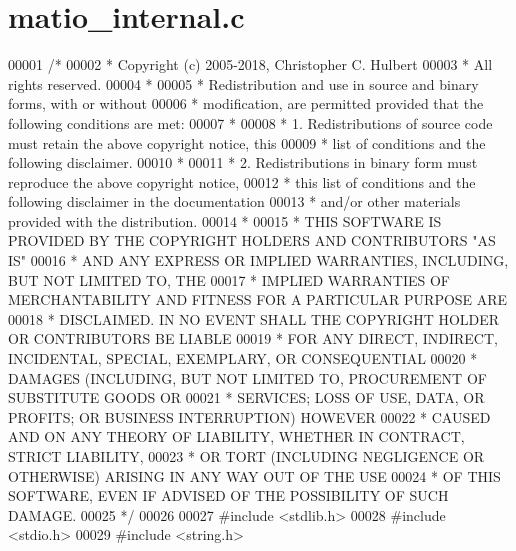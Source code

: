 \hypertarget{matio__internal_8c_source}{}\section{matio\+\_\+internal.\+c}
\label{matio__internal_8c_source}

\begin{DoxyCode}
00001 \textcolor{comment}{/*}
00002 \textcolor{comment}{ * Copyright (c) 2005-2018, Christopher C. Hulbert}
00003 \textcolor{comment}{ * All rights reserved.}
00004 \textcolor{comment}{ *}
00005 \textcolor{comment}{ * Redistribution and use in source and binary forms, with or without}
00006 \textcolor{comment}{ * modification, are permitted provided that the following conditions are met:}
00007 \textcolor{comment}{ *}
00008 \textcolor{comment}{ * 1. Redistributions of source code must retain the above copyright notice, this}
00009 \textcolor{comment}{ *    list of conditions and the following disclaimer.}
00010 \textcolor{comment}{ *}
00011 \textcolor{comment}{ * 2. Redistributions in binary form must reproduce the above copyright notice,}
00012 \textcolor{comment}{ *    this list of conditions and the following disclaimer in the documentation}
00013 \textcolor{comment}{ *    and/or other materials provided with the distribution.}
00014 \textcolor{comment}{ *}
00015 \textcolor{comment}{ * THIS SOFTWARE IS PROVIDED BY THE COPYRIGHT HOLDERS AND CONTRIBUTORS "AS IS"}
00016 \textcolor{comment}{ * AND ANY EXPRESS OR IMPLIED WARRANTIES, INCLUDING, BUT NOT LIMITED TO, THE}
00017 \textcolor{comment}{ * IMPLIED WARRANTIES OF MERCHANTABILITY AND FITNESS FOR A PARTICULAR PURPOSE ARE}
00018 \textcolor{comment}{ * DISCLAIMED. IN NO EVENT SHALL THE COPYRIGHT HOLDER OR CONTRIBUTORS BE LIABLE}
00019 \textcolor{comment}{ * FOR ANY DIRECT, INDIRECT, INCIDENTAL, SPECIAL, EXEMPLARY, OR CONSEQUENTIAL}
00020 \textcolor{comment}{ * DAMAGES (INCLUDING, BUT NOT LIMITED TO, PROCUREMENT OF SUBSTITUTE GOODS OR}
00021 \textcolor{comment}{ * SERVICES; LOSS OF USE, DATA, OR PROFITS; OR BUSINESS INTERRUPTION) HOWEVER}
00022 \textcolor{comment}{ * CAUSED AND ON ANY THEORY OF LIABILITY, WHETHER IN CONTRACT, STRICT LIABILITY,}
00023 \textcolor{comment}{ * OR TORT (INCLUDING NEGLIGENCE OR OTHERWISE) ARISING IN ANY WAY OUT OF THE USE}
00024 \textcolor{comment}{ * OF THIS SOFTWARE, EVEN IF ADVISED OF THE POSSIBILITY OF SUCH DAMAGE.}
00025 \textcolor{comment}{ */}
00026 
00027 \textcolor{preprocessor}{#include <stdlib.h>}
00028 \textcolor{preprocessor}{#include <stdio.h>}
00029 \textcolor{preprocessor}{#include <string.h>}

\end{DoxyCode}
